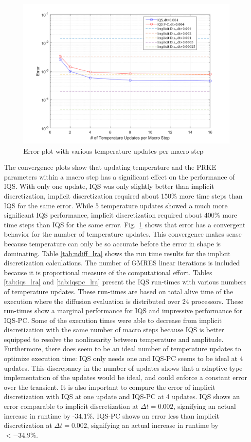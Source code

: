\documentclass{elsarticle}
\newcommand{\fig}[1]{Fig.~\ref{#1}}                      %
\newcommand{\iqspc}{IQS-PC\xspace}
\begin{document}
\begin{figure}[htbp!]
\centering
\includegraphics[height=3in]{figures/lra_mp.png}
\caption{Error plot with various temperature updates per macro step}
\label{fig:mp}
\end{figure}

The convergence plots show that updating temperature and the PRKE parameters within a macro step has a significant effect on the performance of IQS.  With only one update, IQS was only slightly better than implicit discretization, implicit discretization required about 150\% more time steps than IQS for the same error.  While 5 temperature updates showed a much more significant IQS performance, implicit discretization required about 400\% more time steps than IQS for the same error.  \fig{fig:mp} shows that error has a convergent behavior for the number of temperature updates.  This convergence makes sense because temperature can only be so accurate before the error in shape is dominating. Table \ref{tab:ndiff_lra} shows the run time results for the implicit discretization calculations. The number of GMRES linear iterations is included because it is proportional measure of the computational effort. Tables \ref{tab:iqs_lra} and \ref{tab:iqspc_lra} present the IQS run-times with various numbers of temperature updates.  These run-times are based on total alive time of the execution where the diffusion evaluation is distributed over 24 processors. These run-times show a marginal performance for IQS and impressive performance for \iqspc.  Some of the execution times were able to decrease from implicit discretization with the same number of macro steps because IQS is better equipped to resolve the nonlinearity between temperature and amplitude. Furthermore, there does seem to be an ideal number of temperature updates to optimize execution time: IQS only needs one and \iqspc seems to be ideal at 4 updates. This discrepancy in the number of updates shows that a adaptive type implementation of the updates would be ideal, and could enforce a constant error over the transient. It is also important to compare the error of implicit discretization with IQS at one update and \iqspc at 4 updates.  IQS shows an error comparable to implicit discretization at $\Delta t = 0.002$, signifying an actual increase in runtime by -34.1\%.  \iqspc shows an error less than implicit discretization at $\Delta t = 0.002$, signifying an actual increase in runtime by $<-34.9\%$.
\end{document}
